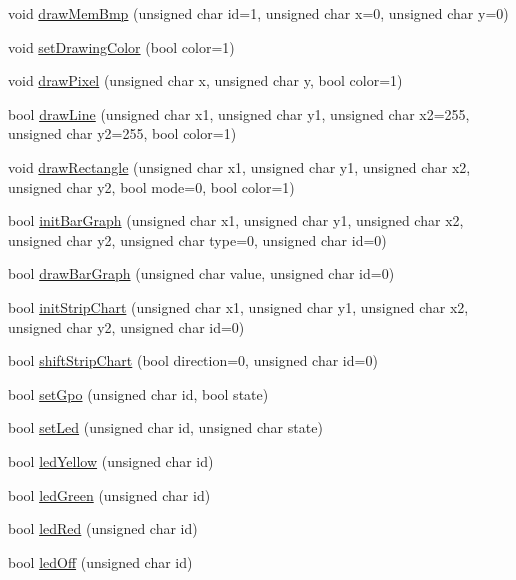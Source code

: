 \begin{CompactItemize}
\item 
void \hyperlink{classmoglk_db45e510307e1c98467d4ee31cc845a6}{drawMemBmp} (unsigned char id=1, unsigned char x=0, unsigned char y=0)
\item 
void \hyperlink{classmoglk_a1345114c86c6834619cf9a335458b96}{setDrawingColor} (bool color=1)
\item 
void \hyperlink{classmoglk_903c108a85fd088ce9d0f2520773a781}{drawPixel} (unsigned char x, unsigned char y, bool color=1)
\item 
bool \hyperlink{classmoglk_d77d8ff35162a554708c3e93c37e0c7a}{drawLine} (unsigned char x1, unsigned char y1, unsigned char x2=255, unsigned char y2=255, bool color=1)
\item 
void \hyperlink{classmoglk_df18bd7ec24c35851bc72d6d09a99483}{drawRectangle} (unsigned char x1, unsigned char y1, unsigned char x2, unsigned char y2, bool mode=0, bool color=1)
\item 
bool \hyperlink{classmoglk_cf20f143dc45f7cffd9cde3de54ea8aa}{initBarGraph} (unsigned char x1, unsigned char y1, unsigned char x2, unsigned char y2, unsigned char type=0, unsigned char id=0)
\item 
bool \hyperlink{classmoglk_cf8048cc54c879ae2ee4942ce451c108}{drawBarGraph} (unsigned char value, unsigned char id=0)
\item 
bool \hyperlink{classmoglk_34c40a476ff9cfd4342c0990dc3fd827}{initStripChart} (unsigned char x1, unsigned char y1, unsigned char x2, unsigned char y2, unsigned char id=0)
\item 
bool \hyperlink{classmoglk_0092806e3cf33100936dd48cc1bbe1ae}{shiftStripChart} (bool direction=0, unsigned char id=0)
\item 
bool \hyperlink{classmoglk_4acb0355df560236b463eb323a61f182}{setGpo} (unsigned char id, bool state)
\item 
bool \hyperlink{classmoglk_7a9fe2fe9dd14ac41e4c2429a5ba1312}{setLed} (unsigned char id, unsigned char state)
\item 
bool \hyperlink{classmoglk_f21d21869ca65ab294c0666b1c0690f3}{ledYellow} (unsigned char id)
\item 
bool \hyperlink{classmoglk_355677082e83cae9f360be695a4ad5bf}{ledGreen} (unsigned char id)
\item 
bool \hyperlink{classmoglk_9ddc6b3f833eff3fe4abc3c80ec6e0a1}{ledRed} (unsigned char id)
\item 
bool \hyperlink{classmoglk_f04915ee646e076725185334596ac586}{ledOff} (unsigned char id)
\item 

\end{CompactItemize}
